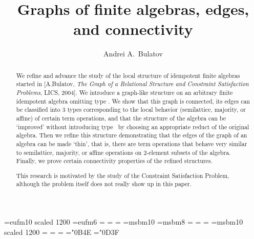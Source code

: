\documentclass[11pt]{article}
\begin{document}
\def\lb{$\linebreak$}  
  
\def\ar{\hbox{ar}} 
\def\Im{{\sf Im}\;} 
\def\deg{{\sf deg}}
\def\id{{\rm id}}
  
\let\al=\alpha 
\let\gm=\gamma 
\let\dl=\delta 
\let\ve=\varepsilon
\let\ld=\lambda 
\let\om=\omega 
\let\vf=\varphi 
\let\vr=\varrho
\let\th=\theta 
\let\sg=\sigma 
\let\Gm=\Gamma 
\let\Dl=\Delta
  


\font\tengoth=eufm10 scaled 1200 
\font\sixgoth=eufm6
\def\goth{\fam12} 
=\tengoth 
{}=\sixgoth
{}=\sixgoth 
\font\tenbur=msbm10
\font\eightbur=msbm8 
\def\bur{\fam13} 
=\tenbur
{}=\eightbur 
{}=\eightbur
\font\twelvebur=msbm10 scaled 1200 
=\twelvebur
{}=\tenbur 
{}=\eightbur
\mathchardef\nat="0B4E 
\mathchardef\eps="0D3F
  
  
\title{Graphs of finite algebras, edges, and connectivity}
\author{Andrei A.\ Bulatov\\ 
} 
\date{} 
\maketitle
\begin{abstract}
We refine and advance the study of the local structure of idempotent finite algebras started
in [A.Bulatov, \emph{The Graph of a Relational Structure and Constraint Satisfaction Problems}, LICS, 2004]. We introduce a 
graph-like structure on an arbitrary finite idempotent algebra omitting type \one. We
show that this graph is connected, its edges can be classified into 3 types corresponding to
the local behavior (semilattice, majority, or affine) of certain term operations, and that
the structure of the algebra can be `improved' without introducing type \one\ by choosing
an appropriate reduct of the original algebra. Then we refine this structure demonstrating 
that the edges of the graph of an algebra can be made `thin', that is, there are term 
operations that behave very similar to semilattice, majority, or affine operations on 
2-element subsets of the algebra. Finally, we prove certain connectivity properties of the refined
structures.

This research is motivated by the study of the Constraint Satisfaction Problem, although
the problem itself does not really show up in this paper.
\end{abstract}
\end{document}
